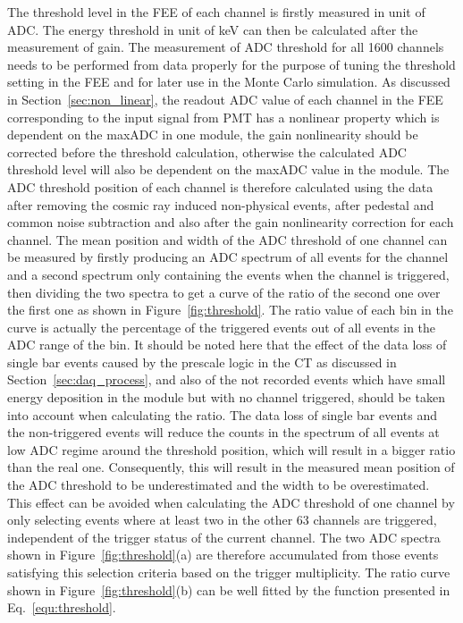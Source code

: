 \documentclass[preprint,sort&compress,12pt]{elsarticle}
\begin{document}
The threshold level in the FEE of each channel is firstly measured in unit of ADC. The energy threshold in unit of keV can then be calculated after the measurement of gain. The measurement of ADC threshold for all 1600 channels needs to be performed from data properly for the purpose of tuning the threshold setting in the FEE and for later use in the Monte Carlo simulation. As discussed in Section~\ref{sec:non_linear}, the readout ADC value of each channel in the FEE corresponding to the input signal from PMT has a nonlinear property which is dependent on the maxADC in one module, the gain nonlinearity should be corrected before the threshold calculation, otherwise the calculated ADC threshold level will also be dependent on the maxADC value in the module. The ADC threshold position of each channel is therefore calculated using the data after removing the cosmic ray induced non-physical events, after pedestal and common noise subtraction and also after the gain nonlinearity correction for each channel. The mean position and width of the ADC threshold of one channel can be measured by firstly producing an ADC spectrum of all events for the channel and a second spectrum only containing the events when the channel is triggered, then dividing the two spectra to get a curve of the ratio of the second one over the first one as shown in Figure~\ref{fig:threshold}. The ratio value of each bin in the curve is actually the percentage of the triggered events out of all events in the ADC range of the bin. It should be noted here that the effect of the data loss of single bar events caused by the prescale logic in the CT as discussed in Section~\ref{sec:daq_process}, and also of the not recorded events which have small energy deposition in the module but with no channel triggered, should be taken into account when calculating the ratio. The data loss of single bar events and the non-triggered events will reduce the counts in the spectrum of all events at low ADC regime around the threshold position, which will result in a bigger ratio than the real one. Consequently, this will result in the measured mean position of the ADC threshold to be underestimated and the width to be overestimated. This effect can be avoided when calculating the ADC threshold of one channel by only selecting events where at least two in the other 63 channels are triggered, independent of the trigger status of the current channel. The two ADC spectra shown in Figure~\ref{fig:threshold}(a) are therefore accumulated from those events satisfying this selection criteria based on the trigger multiplicity. The ratio curve shown in Figure~\ref{fig:threshold}(b) can be well fitted by the function presented in Eq.~\eqref{equ:threshold}.
\end{document}
